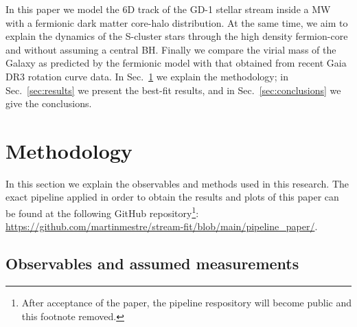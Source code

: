 \documentclass[twocolumn]{aa}
\begin{document}
In this paper we model the 6D track of the GD-1 stellar stream inside a MW with a fermionic dark matter core-halo distribution. At the same time, we aim to explain the dynamics of the S-cluster stars through the high density fermion-core and without assuming a central BH. Finally we compare the virial mass of the Galaxy as predicted by the fermionic model with that obtained from recent Gaia DR3 rotation curve data. In Sec.~\ref{sec:methodology} we explain the methodology; in Sec.~\ref{sec:results} we present the best-fit results, and in Sec.~\ref{sec:conclusions} we give the conclusions.

\section{Methodology}
\label{sec:methodology}
In this section we explain the observables and methods used in this research.
The exact pipeline applied in order to obtain the results and plots of this paper
can be found at the following GitHub repository\footnote{After acceptance of the paper,
the pipeline respository will become public and this footnote removed.}:
\url{https://github.com/martinmestre/stream-fit/blob/main/pipeline_paper/}.

\subsection{Observables and assumed measurements}
\label{sec:observables}
\end{document}
